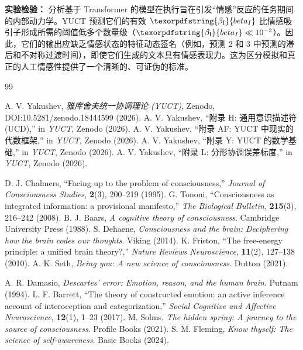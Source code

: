 \documentclass[12pt,a4paper]{article}
\DeclareRobustCommand{\beI}{\texorpdfstring{\ensuremath{\beta_{\mathrm{I}}}}{beta_I}}
\begin{document}
		\textbf{实验检验：} 分析基于 Transformer 的模型在执行旨在引发“情感”反应的任务期间的内部动力学。YUCT 预测它们的有效 \(\beI\) 比情感吸引子形成所需的阈值低多个数量级（\(\beI \ll 10^{-2}\)）。因此，它们的输出应缺乏情感状态的特征动态签名（例如，预测 2 和 3 中预测的滞后和不对称过渡时间），即使它们生成的文本具有情感表现力。这为区分模拟和真正的人工情感性提供了一个清晰的、可证伪的标准。
		
		\begin{thebibliography}{99}
		
		 A. V. Yakushev, \emph{雅库舍夫统一协调理论 (YUCT)}, Zenodo, DOI:10.5281/zenodo.18444599 (2026).
		 A. V. Yakushev, ``附录 H: 通用意识描述符 (UCD),'' in \emph{YUCT}, Zenodo (2026).
		 A. V. Yakushev, ``附录 AF: YUCT 中现实的代数框架,'' in \emph{YUCT}, Zenodo (2026).
		 A. V. Yakushev, ``附录 Y: YUCT 的数学基础,'' in \emph{YUCT}, Zenodo (2026).
		 A. V. Yakushev, ``附录 L: 分形协调误差标度,'' in \emph{YUCT}, Zenodo (2026).
		
		 D. J. Chalmers, ``Facing up to the problem of consciousness,'' \emph{Journal of Consciousness Studies}, \textbf{2}(3), 200--219 (1995).
		 G. Tononi, ``Consciousness as integrated information: a provisional manifesto,'' \emph{The Biological Bulletin}, \textbf{215}(3), 216--242 (2008).
		 B. J. Baars, \emph{A cognitive theory of consciousness}. Cambridge University Press (1988).
		 S. Dehaene, \emph{Consciousness and the brain: Deciphering how the brain codes our thoughts}. Viking (2014).
		 K. Friston, ``The free-energy principle: a unified brain theory?,'' \emph{Nature Reviews Neuroscience}, \textbf{11}(2), 127--138 (2010).
		 A. K. Seth, \emph{Being you: A new science of consciousness}. Dutton (2021).
		
		 A. R. Damasio, \emph{Descartes' error: Emotion, reason, and the human brain}. Putnam (1994).
		 L. F. Barrett, ``The theory of constructed emotion: an active inference account of interoception and categorization,'' \emph{Social Cognitive and Affective Neuroscience}, \textbf{12}(1), 1--23 (2017).
		 M. Solms, \emph{The hidden spring: A journey to the source of consciousness}. Profile Books (2021).
		 S. M. Fleming, \emph{Know thyself: The science of self-awareness}. Basic Books (2024).
		

\end{thebibliography}
\end{document}
